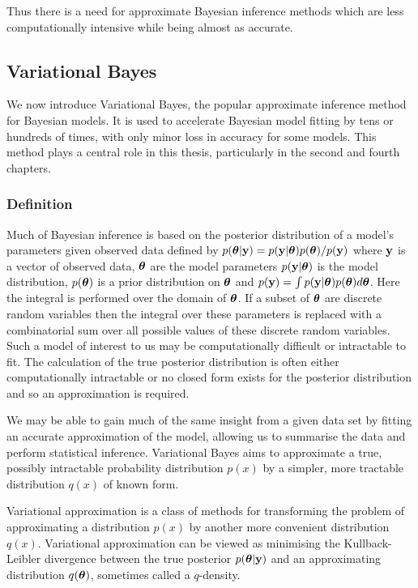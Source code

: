 Thus there is a need for approximate Bayesian inference methods which are less computationally intensive while
being almost as accurate.

 
\subsection{Variational Bayes}
\label{sec:vb}
We now introduce Variational Bayes, the popular approximate inference method for Bayesian models. It is used
to accelerate Bayesian model fitting by tens or hundreds of times, with only minor loss in accuracy for some
models. This method plays a central role in this thesis, particularly in the second and fourth chapters.

\subsubsection{Definition}
Much of Bayesian inference is based on the posterior distribution of a model's parameters given observed data
defined by $p({\boldsymbol \theta}|{\bf y}) = p({\bf y}|{\boldsymbol \theta})p({\boldsymbol \theta})/p({\bf y})$ where ${\bf y}$ is a vector of observed data,
${\boldsymbol \theta}$ are the model parameters $p({\bf y}|{\boldsymbol \theta})$ is the model distribution, $p({\boldsymbol \theta})$ is a prior
distribution on ${\boldsymbol \theta}$ and $p({\bf y})=\int p({\bf y}|{\boldsymbol \theta})p({\boldsymbol \theta})d{\boldsymbol \theta}$. Here the integral is performed
over the domain of ${\boldsymbol \theta}$. If a subset of ${\boldsymbol \theta}$ are discrete random variables then the integral over
these parameters is replaced with a combinatorial sum over all possible values of these discrete random
variables. Such a model of interest to us may be computationally difficult or intractable to fit.  The
calculation of the true posterior distribution is often either computationally intractable or no closed form
exists for the posterior distribution and so an approximation is required.

We may be able to gain much of the same insight from a given data set by fitting an accurate
approximation  of the model, allowing us to summarise the data and perform statistical inference. Variational
Bayes aims to approximate a true, possibly intractable probability distribution $p(x)$ by a simpler, more
tractable distribution $q(x)$ of known form.

Variational approximation is a class of methods for transforming the problem of approximating a distribution
$p(x)$ by another more convenient distribution $q(x)$. Variational approximation can be viewed as minimising
the Kullback- Leibler divergence between the true posterior $p({\boldsymbol \theta}|{\bf y})$ and an approximating distribution
$q({\boldsymbol \theta})$, sometimes called a $q$-density.

